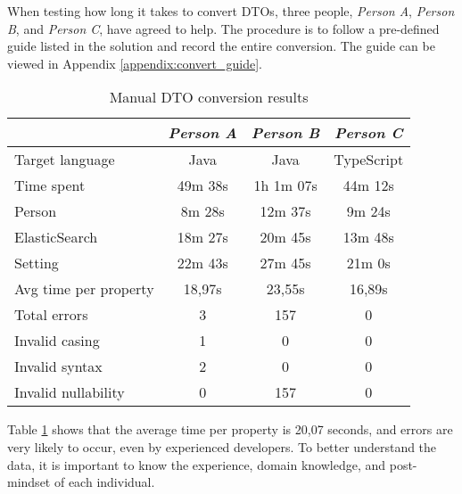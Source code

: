 When testing how long it takes to convert DTOs, three people, \textit{Person A}, \textit{Person B}, and \textit{Person C}, have agreed to help. 
The procedure is to follow a pre-defined guide listed in the solution and record the entire conversion. 
The guide can be viewed in Appendix \ref{appendix:convert_guide}.
\begin{table}[H]
   \small
   \centering
   \begin{tabular}{lccc}

   \toprule
   \textit{} & \textit{Person A} & \textit{Person B} & \textit{Person C} \\ 
   \midrule
   Target language & Java & Java & TypeScript \\
   Time spent & 49m 38s & 1h 1m 07s & 44m 12s \\
   \hspace{3mm} Person & 8m 28s & 12m 37s & 9m 24s \\  %
   \hspace{3mm} ElasticSearch & 18m 27s & 20m 45s & 13m 48s \\ %
   \hspace{3mm} Setting & 22m 43s & 27m 45s & 21m 0s \\ %
   Avg time per property & 18,97s  & 23,55s & 16,89s \\
   Total errors & 3 & 157 & 0 \\
   \hspace{3mm} Invalid casing & 1 & 0 & 0 \\
   \hspace{3mm} Invalid syntax & 2 & 0 & 0 \\
   \hspace{3mm} Invalid nullability & 0 & 157 & 0 \\
   \bottomrule
   \end{tabular}
   \caption{Manual DTO conversion results} 
   \label{tab:dto_task}
\end{table}
\noindent
Table \ref{tab:dto_task} shows that the average time per property is 20,07 seconds, and errors are very likely to occur, even by experienced developers.
To better understand the data, it is important to know the experience, domain knowledge, and post-mindset of each individual.

